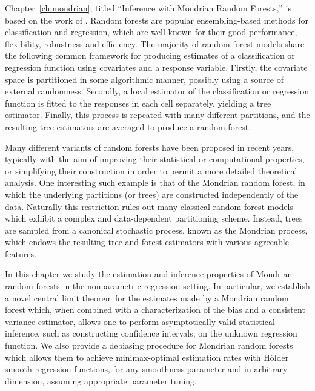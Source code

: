 Chapter~\ref{ch:mondrian}, titled ``Inference with Mondrian Random Forests,''
is based on the work of \cite{cattaneo2023inference}.
Random forests are popular ensembling-based methods for classification and
regression, which are well known for their good performance, flexibility,
robustness and efficiency. The majority of random forest models share the
following common framework for producing estimates of a classification or
regression function using covariates and a response variable. Firstly, the
covariate space is partitioned in some algorithmic manner, possibly using a
source of external randomness. Secondly, a local estimator of the
classification or regression function is fitted to the responses in each cell
separately, yielding a tree estimator. Finally, this process is repeated with
many different partitions, and the resulting tree estimators are averaged to
produce a random forest.

Many different variants of random forests have been proposed in recent years,
typically with the aim of improving their statistical or computational
properties, or simplifying their construction in order to permit a more
detailed theoretical analysis.
One interesting such example is that of the Mondrian random forest, in which
the underlying partitions (or trees) are constructed independently of the data.
Naturally this restriction rules out many classical random forest models which
exhibit a complex and data-dependent partitioning scheme. Instead, trees are
sampled from a canonical stochastic process, known as the Mondrian process,
which endows the resulting tree and forest estimators with various agreeable
features.

In this chapter we study the estimation and inference properties of Mondrian
random forests in the nonparametric regression setting. In particular, we
establish a novel central limit theorem for the estimates made by a Mondrian
random forest which, when combined with a characterization of the bias and a
consistent variance estimator, allows one to perform asymptotically valid
statistical inference, such as constructing confidence intervals, on the
unknown regression function. We also provide a debiasing procedure for Mondrian
random forests which allows them to achieve minimax-optimal estimation rates
with H{\"o}lder smooth regression functions, for any smoothness parameter and
in arbitrary dimension, assuming appropriate parameter tuning.

